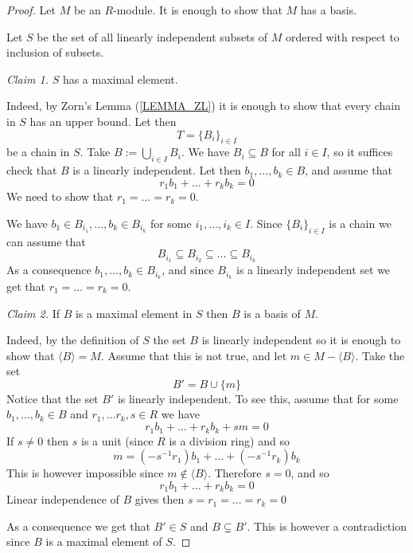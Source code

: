 \documentclass[12pt, letterpaper, oneside]{article}
\theoremstyle{plain}
\theoremstyle{definition}
\newcommand{\subgp}[1]{\langle#1\rangle}
\newcommand{\vs}{\vskip 5mm}
\begin{document}
 \begin{proof}
 Let $M$ be an $R$-module. It is enough to show that  $M$ has a basis. 
 
 Let $S$ be the set of all linearly independent subsets of $M$ ordered with respect 
 to inclusion of subsets. 
 
 \emph{Claim 1.} $S$ has a maximal element. 
 
 Indeed, by Zorn's Lemma (\ref{LEMMA_ZL}) it is enough to show that every chain
 in $S$ has an upper bound. Let then
$$T = \{B_{i}\}_{i\in I}$$
be a chain in $S$. Take $B := \bigcup_{i\in I} B_{i}$. We have $B_{i} \subseteq B$
for all $i\in I$, so it suffices check that $B$ is a linearly independent. Let then 
$b_{1}, \dots, b_{k}\in B$, and assume that 
$$r_{1}b_{1} + {\dots} + r_{k}b_{k} = 0$$
We need to show that $r_{1} = {\dots} = r_{k} = 0$.


We have 
$b_{1}\in B_{i_{1}}, \dots, b_{k}\in B_{i_{k}}$ for some $i_{1}, \dots, i_{k}\in I$.  Since 
$\{B_{i}\}_{i\in I}$ is a chain we can assume that 
$$B_{i_{1}} \subseteq B_{i_{2}} \subseteq {\dots} \subseteq B_{i_{k}}$$
As a consequence $b_{1}, {\dots}, b_{k}\in B_{i_{k}}$, and since $B_{i_{k}}$ is a linearly 
independent set we get that $r_{1} = {\dots} = r_{k} = 0$.

\vs

\emph{Claim 2.} If $B$ is a maximal element in $S$ then $B$ is a basis of $M$. 

Indeed, by the definition of $S$ the set $B$ is linearly independent so it is enough to show 
that $\subgp{B} = M$. Assume that this is not true, and let $m\in M - \subgp{B}$. 
Take the set 
$$B' = B \cup \{m\}$$
Notice that the set $B'$ is linearly independent. To see this, assume that  for some 
$b_{1}, \dots, b_{k} \in B$ and $r_{1}, \dots r_{k}, s \in R$ we have 
$$r_{1}b_{1} + {\dots} + r_{k}b_{k} + sm = 0$$
If $s\neq 0$ then $s$ is a unit (since $R$ is a division ring) and so 
$$m = (-s^{-1}r_{1})b_{1}  + {\dots} +(- s^{-1}r_{k})b_{k}$$
This is however impossible since $m\not\in \subgp{B}$. Therefore $s=0$, and so 
$$r_{1}b_{1} + {\dots} + r_{k}b_{k}  = 0$$
Linear independence of $B$ gives then $s= r_{1} = {\dots} = r_{k} = 0$

\vs 

As a consequence  we get that $B'\in S$ and $B\subsetneq B'$. This is however a contradiction
since $B$ is a maximal element of $S$.





 \end{proof}
 
\end{document}
